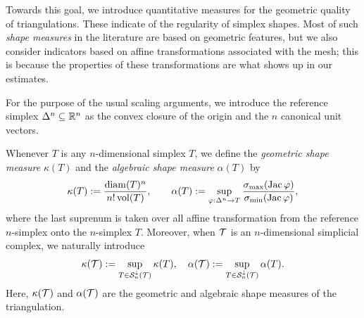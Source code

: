 \documentclass[10pt,letterpaper]{article}
\begin{document}
Towards this goal, we introduce quantitative measures for the geometric quality of triangulations. 
These indicate of the regularity of simplex shapes. 
Most of such \emph{shape measures} in the literature are based on geometric features, 
but we also consider indicators based on affine transformations associated with the mesh;
this is because the properties of these transformations are what shows up in our estimates. 

For the purpose of the usual scaling arguments, we introduce the reference simplex $\Delta^n \subseteq {\mathbb R}^n$ as the convex closure of the origin and the $n$ canonical unit vectors. 

Whenever $T$ is any $n$-dimensional simplex $T$,
we define the \textit{geometric shape measure} $\kappa(T)$
and the \textit{algebraic shape measure} $\alpha(T)$ by 
\begin{align}\label{math:shapemeasure}
    \kappa(T)
    := 
    \frac{ {\operatorname{diam}}(T)^{n} }{ n! \operatorname{vol}(T) }
    ,
    \qquad 
    \alpha(T)
    := 
    \sup_{ \varphi : \Delta^n \rightarrow T } 
    \frac{ \sigma_{\max}( \operatorname{{\rm Jac}} \varphi ) }{ \sigma_{\min}( \operatorname{{\rm Jac}} \varphi ) }
    ,
\end{align}
where the last suprenum is taken over all affine transformation from the reference $n$-simplex onto the $n$-simplex $T$. 
Moreover, when ${\mathcal T}$ is an $n$-dimensional simplicial complex, we naturally introduce 
\begin{align}\label{math:shapemeasure:triangulation}
    \kappa({\mathcal T}) := \sup_{ T \in {\mathcal S}^{\downarrow}_{n}({\mathcal T}) } \kappa(T),
    \quad 
    \alpha({\mathcal T}) := \sup_{ T \in {\mathcal S}^{\downarrow}_{n}({\mathcal T}) } \alpha(T).
\end{align}
Here, $\kappa({\mathcal T})$ and $\alpha({\mathcal T})$ are the geometric and algebraic shape measures of the triangulation.
\end{document}
